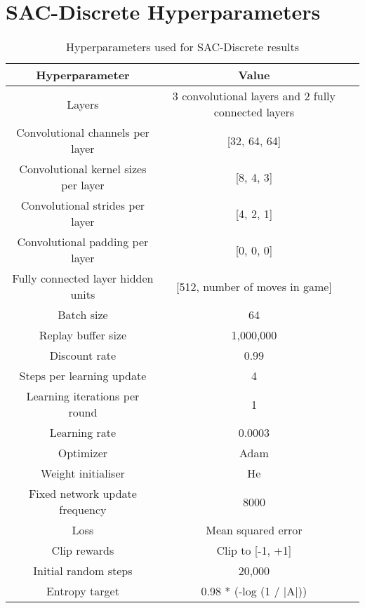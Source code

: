 \documentclass{article}
\begin{document}
\clearpage
\section{SAC-Discrete Hyperparameters}
\label{sachyperparameters}


\begin{table}[h]
\centering

\bgroup
\def\arraystretch{1.1}\caption{Hyperparameters used for SAC-Discrete results}
\label{SAChyperparms}

\begin{tabular}{|c|c|c|}
\hline
\textbf{Hyperparameter}  & \textbf{Value}  \\ \hline
Layers & 3 convolutional layers and 2 fully connected layers \\ \hline
Convolutional channels per layer & [32, 64, 64] \\ \hline
Convolutional kernel sizes per layer & [8, 4, 3] \\ \hline
Convolutional strides per layer & [4, 2, 1] \\ \hline
Convolutional padding per layer & [0, 0, 0] \\ \hline
Fully connected layer hidden units & [512, number of moves in game] \\ \hline
Batch size         & 64             \\ \hline
Replay buffer size         & 1,000,000            \\ \hline
Discount rate         & 0.99             \\ \hline
Steps per learning update         & 4            \\ \hline
Learning iterations per round         & 1             \\ \hline
Learning rate         & 0.0003            \\ \hline
Optimizer         & Adam             \\ \hline
Weight initialiser         & He            \\ \hline
Fixed network update frequency        & 8000            \\ \hline
Loss        & Mean squared error            \\ \hline
Clip rewards        & Clip to [-1, +1]             \\ \hline
Initial random steps & 20,000             \\ \hline
Entropy target & 0.98 * (-log (1 / |A|)) \\ \hline
\end{tabular}
\egroup
\end{table}
\end{document}
